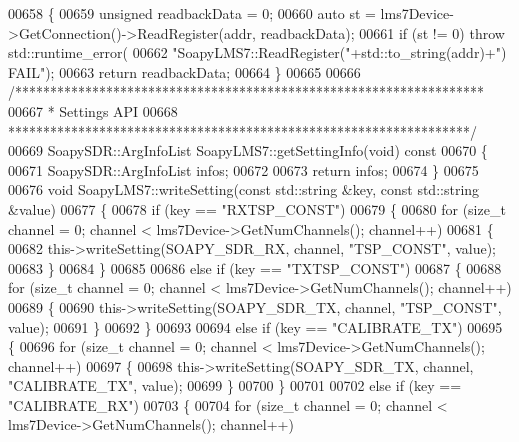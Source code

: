 \begin{DoxyCode}
{{{{{{{{{{{{{{00658 \textcolor{keyword}{}\{
00659     \textcolor{keywordtype}{unsigned} readbackData = 0;
00660     \textcolor{keyword}{auto} st = lms7Device->GetConnection()->ReadRegister(addr, readbackData);
00661     \textcolor{keywordflow}{if} (st != 0) \textcolor{keywordflow}{throw} std::runtime\_error(
00662         \textcolor{stringliteral}{"SoapyLMS7::ReadRegister("}+std::to\_string(addr)+\textcolor{stringliteral}{") FAIL"});
00663     \textcolor{keywordflow}{return} readbackData;
00664 \}
00665 
00666 \textcolor{comment}{/*******************************************************************}
00667 \textcolor{comment}{ * Settings API}
00668 \textcolor{comment}{ ******************************************************************/}
00669 SoapySDR::ArgInfoList SoapyLMS7::getSettingInfo(\textcolor{keywordtype}{void})\textcolor{keyword}{ const}
00670 \textcolor{keyword}{}\{
00671     SoapySDR::ArgInfoList infos;
00672 
00673     \textcolor{keywordflow}{return} infos;
00674 \}
00675 
00676 \textcolor{keywordtype}{void} SoapyLMS7::writeSetting(\textcolor{keyword}{const} std::string &key, \textcolor{keyword}{const} std::string &value)
00677 \{
00678     \textcolor{keywordflow}{if} (key == \textcolor{stringliteral}{"RXTSP\_CONST"})
00679     \{
00680         \textcolor{keywordflow}{for} (\textcolor{keywordtype}{size\_t} channel = 0; channel < lms7Device->GetNumChannels(); channel++)
00681         \{
00682             this->writeSetting(SOAPY\_SDR\_RX, channel, \textcolor{stringliteral}{"TSP\_CONST"}, value);
00683         \}
00684     \}
00685 
00686     \textcolor{keywordflow}{else} \textcolor{keywordflow}{if} (key == \textcolor{stringliteral}{"TXTSP\_CONST"})
00687     \{
00688         \textcolor{keywordflow}{for} (\textcolor{keywordtype}{size\_t} channel = 0; channel < lms7Device->GetNumChannels(); channel++)
00689         \{
00690             this->writeSetting(SOAPY\_SDR\_TX, channel, \textcolor{stringliteral}{"TSP\_CONST"}, value);
00691         \}
00692     \}
00693 
00694     \textcolor{keywordflow}{else} \textcolor{keywordflow}{if} (key == \textcolor{stringliteral}{"CALIBRATE\_TX"})
00695     \{
00696         \textcolor{keywordflow}{for} (\textcolor{keywordtype}{size\_t} channel = 0; channel < lms7Device->GetNumChannels(); channel++)
00697         \{
00698             this->writeSetting(SOAPY\_SDR\_TX, channel, \textcolor{stringliteral}{"CALIBRATE\_TX"}, value);
00699         \}
00700     \}
00701 
00702     \textcolor{keywordflow}{else} \textcolor{keywordflow}{if} (key == \textcolor{stringliteral}{"CALIBRATE\_RX"})
00703     \{
00704         \textcolor{keywordflow}{for} (\textcolor{keywordtype}{size\_t} channel = 0; channel < lms7Device->GetNumChannels(); channel++)
}}}}}}}}}}}}}}
\end{DoxyCode}
